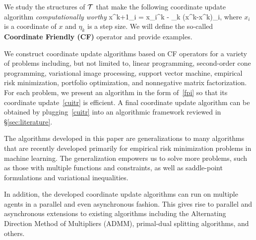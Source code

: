 We study the structures of ${\mathcal{T}}$ that make the  following coordinate update algorithm \emph{computationally worthy}
\beq\label{cuitr}
x^{k+1}_i = x_i^k - \eta_k (x^k-\cT x^k)_i,
\eeq
where $x_i$ is a coordinate of $x$ and $\eta_k$ is a  step size. We will define the so-called \textbf{Coordinate Friendly (CF)} operator and provide examples. 

We construct coordinate update algorithms based on CF operators for a variety of problems including, but not limited to, linear programming, second-order cone programming, variational image processing, support vector machine, empirical risk minimization, portfolio optimization, and nonnegative matrix factorization. For each problem, we present an algorithm in the form of~\eqref{fpi} so that its coordinate update~\eqref{cuitr} is efficient. A final coordinate update algorithm can be obtained by plugging~\eqref{cuitr} into an algorithmic framework reviewed in \S\ref{sec:literature}. 

The algorithms developed in this paper are generalizations to many algorithms that are recently developed primarily for empirical risk minimization problems in machine learning. %
The generalization empowers us to solve more problems, such as those with multiple functions and constraints, as well as saddle-point formulations and variational inequalities.


In addition, the developed coordinate update algorithms can run on multiple agents in a parallel and even asynchronous fashion. This gives rise to parallel and asynchronous extensions to  existing algorithms including the Alternating Direction Method of Multipliers (ADMM), primal-dual splitting algorithms, and others.

